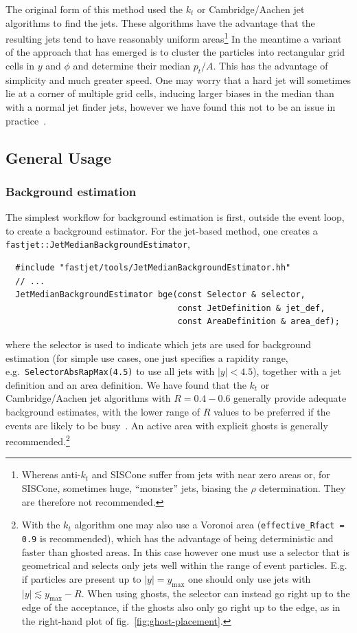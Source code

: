\documentclass[12pt,a4]{article}
\newcommand{\ttt}[1]{{\small\texttt{#1}}}
\begin{document}
The original form of this method used the $k_t$ or Cambridge/Aachen
jet algorithms to find the jets.
%
These algorithms have the advantage that the resulting jets tend to
have reasonably uniform areas\footnote{Whereas anti-$k_t$ and SISCone
  suffer from jets with near zero areas or, for SISCone, sometimes
  huge, ``monster'' jets, biasing the $\rho$ determination. They are
  therefore not recommended.}
%
In the meantime a variant of the approach that has emerged is to
cluster the particles into rectangular grid cells in $y$ and $\phi$
and determine their median $p_t/A$.
%
This has the advantage of simplicity and much greater speed. 
%
One may worry that a hard jet will sometimes lie at a corner of
multiple grid cells, inducing larger biases in the median than with a
normal jet finder jets, however we have found this not
to be an issue in practice~\cite{GridMedianLH}.

\subsection{General Usage}\label{sec:bkg_general_usage}

\subsubsection{Background estimation}\label{sec:bkg_estim_usage}

The simplest workflow for background estimation is first, outside the
event loop, to create a background estimator.
%
For the jet-based method, one creates a
\ttt{fastjet::JetMedianBackgroundEstimator},
\begin{lstlisting}
  #include "fastjet/tools/JetMedianBackgroundEstimator.hh"
  // ...
  JetMedianBackgroundEstimator bge(const Selector & selector,
                                   const JetDefinition & jet_def,
                                   const AreaDefinition & area_def);
\end{lstlisting}
where the selector is used to indicate which jets are used for
background estimation (for simple use cases, one just specifies a
rapidity range, e.g.\ \ttt{SelectorAbsRapMax(4.5)} to use all jets
with $|y|<4.5$), together with a jet definition  and an area
definition. 
%
We have found that the $k_t$ or Cambridge/Aachen jet algorithms with $R
= 0.4 - 0.6$ generally provide adequate background estimates, with
the lower range of $R$ values to be preferred if the events are likely
to be busy~\cite{Cacciari:2009dp,GridMedianLH}.
%
An active area with explicit ghosts is generally
recommended.\footnote{With the $k_t$ algorithm one may also use a
  Voronoi area (\texttt{effective\_Rfact = 0.9} is recommended), which
  has the advantage of being deterministic and faster than ghosted
  areas. In this case however one must use a selector that is
  geometrical and selects only jets well within the range of event
  particles. 
  E.g. if particles are present up to $|y| = y_{\max}$ one should only
  use jets with $|y| \lesssim y_{\max} - R$.
  When using ghosts, the selector can instead go right up
  to the edge of the acceptance, if the ghosts also only go right up
  to the edge, as in the right-hand plot of
  fig.~\ref{fig:ghost-placement}.}
%
\end{document}
